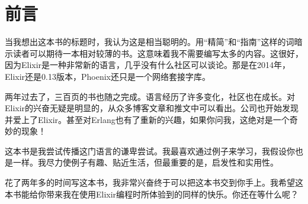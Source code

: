 \chapter*{前言}\label{preface}

当我想出这本书的标题时，我认为这是相当聪明的。用``精简''和``指南''这样的词暗示读者可以期待一本相对较薄的书。这意味着我不需要编写太多的内容。这很好，因为Elixir是一种非常新的语言，几乎没有什么社区可以谈论。那是在2014年，Elixir还是0.13版本，Phoenix还只是一个网络套接字库。

两年过去了，三百页的书也随之完成。语言经历了许多变化，社区也在成长。对Elixir的兴奋无疑是明显的，从众多博客文章和推文中可以看出。公司也开始发现并爱上了Elixir。甚至对Erlang也有了重新的兴趣，如果你问我，这绝对是一个奇妙的现象！

这本书是我尝试传播这门语言的谦卑尝试。我最喜欢通过例子来学习，我假设你也是一样。我尽力使例子有趣、贴近生活，但最重要的是，启发性和实用性。

花了两年多的时间写这本书，我非常兴奋终于可以把这本书交到你手上。我希望这本书能给你带来我在使用Elixir编程时所体验到的同样的快乐。你还在等什么呢？
